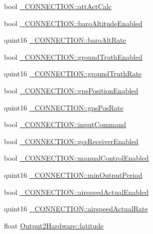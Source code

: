 \begin{DoxyCompactItemize}
\item 
bool \hyperlink{group___h_i_t_l_plugin_gab40adc150ae79f115f2680cdf131b41d}{\-\_\-\-C\-O\-N\-N\-E\-C\-T\-I\-O\-N\-::att\-Act\-Calc}
\item 
bool \hyperlink{group___h_i_t_l_plugin_ga6700d3be0f4ef9211d6f34569034b7a8}{\-\_\-\-C\-O\-N\-N\-E\-C\-T\-I\-O\-N\-::baro\-Altitude\-Enabled}
\item 
quint16 \hyperlink{group___h_i_t_l_plugin_gab5b66abe21b9a0f00b2dc2bbb28cac6c}{\-\_\-\-C\-O\-N\-N\-E\-C\-T\-I\-O\-N\-::baro\-Alt\-Rate}
\item 
bool \hyperlink{group___h_i_t_l_plugin_ga7da92539dd2e9e4aeb94b848dc464b11}{\-\_\-\-C\-O\-N\-N\-E\-C\-T\-I\-O\-N\-::ground\-Truth\-Enabled}
\item 
quint16 \hyperlink{group___h_i_t_l_plugin_ga46aa73f7e222771afe3b547bca31eacb}{\-\_\-\-C\-O\-N\-N\-E\-C\-T\-I\-O\-N\-::ground\-Truth\-Rate}
\item 
bool \hyperlink{group___h_i_t_l_plugin_gaec1f5b5cc3ce18186907fde4c9c990b3}{\-\_\-\-C\-O\-N\-N\-E\-C\-T\-I\-O\-N\-::gps\-Position\-Enabled}
\item 
quint16 \hyperlink{group___h_i_t_l_plugin_ga2904afd635e416ec6fca4b3b6bb8679f}{\-\_\-\-C\-O\-N\-N\-E\-C\-T\-I\-O\-N\-::gps\-Pos\-Rate}
\item 
bool \hyperlink{group___h_i_t_l_plugin_gaef59cc30b3dc3c996cfba35065d250bd}{\-\_\-\-C\-O\-N\-N\-E\-C\-T\-I\-O\-N\-::input\-Command}
\item 
bool \hyperlink{group___h_i_t_l_plugin_ga2e4de2a270dafeeadda687a7fc6fb817}{\-\_\-\-C\-O\-N\-N\-E\-C\-T\-I\-O\-N\-::gcs\-Receiver\-Enabled}
\item 
bool \hyperlink{group___h_i_t_l_plugin_gac67de1b6ac74a48c592f55fd17e06ad8}{\-\_\-\-C\-O\-N\-N\-E\-C\-T\-I\-O\-N\-::manual\-Control\-Enabled}
\item 
quint16 \hyperlink{group___h_i_t_l_plugin_ga11d8608f07438f05d1950aa62f774d0c}{\-\_\-\-C\-O\-N\-N\-E\-C\-T\-I\-O\-N\-::min\-Output\-Period}
\item 
bool \hyperlink{group___h_i_t_l_plugin_ga8fc341e96193fe41625a04a534a16387}{\-\_\-\-C\-O\-N\-N\-E\-C\-T\-I\-O\-N\-::airspeed\-Actual\-Enabled}
\item 
quint16 \hyperlink{group___h_i_t_l_plugin_gacb3c852192e75845b2a17679c94a10c1}{\-\_\-\-C\-O\-N\-N\-E\-C\-T\-I\-O\-N\-::airspeed\-Actual\-Rate}
\item 
float \hyperlink{group___h_i_t_l_plugin_ga3f453b19b12f4264ebffe76a1e8ee93d}{\-Output2\-Hardware\-::latitude}
\item 

\end{DoxyCompactItemize}
